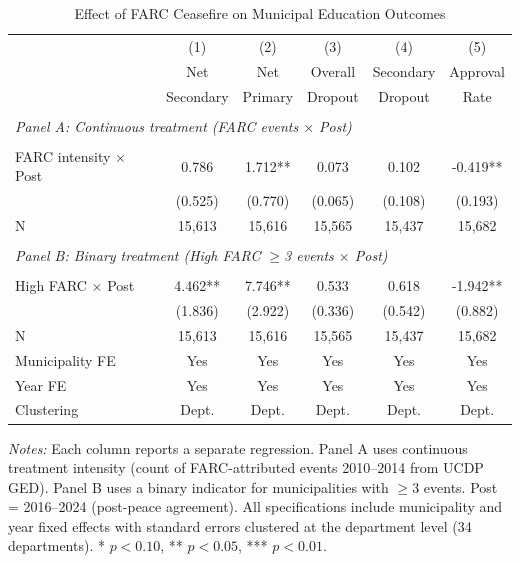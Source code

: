 \begin{table}[H]
\centering
\caption{Effect of FARC Ceasefire on Municipal Education Outcomes}
\label{tab:main}
\begin{threeparttable}
\begin{tabular}{lccccc}
\toprule
 & (1) & (2) & (3) & (4) & (5) \\
 & Net & Net & Overall & Secondary & Approval \\
 & Secondary & Primary & Dropout & Dropout & Rate \\
\midrule
\\[-1em]
\multicolumn{6}{l}{\textit{Panel A: Continuous treatment (FARC events $\times$ Post)}} \\
\\[0.3em]
FARC intensity $\times$ Post & 0.786 & 1.712** & 0.073 & 0.102 & -0.419** \\
 & (0.525) & (0.770) & (0.065) & (0.108) & (0.193) \\
N & 15,613 & 15,616 & 15,565 & 15,437 & 15,682 \\
\\[0.5em]
\multicolumn{6}{l}{\textit{Panel B: Binary treatment (High FARC $\geq$3 events $\times$ Post)}} \\
\\[0.3em]
High FARC $\times$ Post & 4.462** & 7.746** & 0.533 & 0.618 & -1.942** \\
 & (1.836) & (2.922) & (0.336) & (0.542) & (0.882) \\
N & 15,613 & 15,616 & 15,565 & 15,437 & 15,682 \\
\midrule
Municipality FE & Yes & Yes & Yes & Yes & Yes \\
Year FE & Yes & Yes & Yes & Yes & Yes \\
Clustering & Dept. & Dept. & Dept. & Dept. & Dept. \\
\bottomrule
\end{tabular}
\begin{tablenotes}[flushleft]
\small
\item \textit{Notes:} Each column reports a separate regression. Panel A uses continuous treatment intensity (count of FARC-attributed events 2010--2014 from UCDP GED). Panel B uses a binary indicator for municipalities with $\geq$3 events. Post = 2016--2024 (post-peace agreement). All specifications include municipality and year fixed effects with standard errors clustered at the department level (34 departments). * $p<0.10$, ** $p<0.05$, *** $p<0.01$.
\end{tablenotes}
\end{threeparttable}
\end{table}

